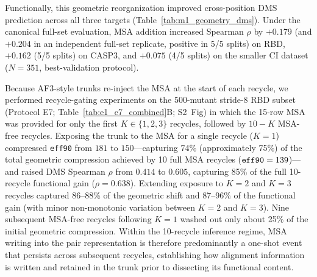 \documentclass[10pt,a4paper]{article}
\begin{document}
Functionally, this geometric reorganization improved cross-position DMS prediction across all three targets (Table~\ref{tab:m1_geometry_dms}). Under the canonical full-set evaluation, MSA addition increased Spearman $\rho$ by $+0.179$ (and $+0.204$ in an independent full-set replicate, positive in 5/5 splits) on RBD, $+0.162$ (5/5 splits) on CASP3, and $+0.075$ (4/5 splits) on the smaller CI dataset ($N=351$, best-validation protocol).

Because AF3-style trunks re-inject the MSA at the start of each recycle, we performed recycle-gating experiments on the 500-mutant stride-8 RBD subset (Protocol E7; Table~\ref{tab:e1_e7_combined}B; S2~Fig) in which the 15-row MSA was provided for only the first $K \in \{1, 2, 3\}$ recycles, followed by $10 - K$ MSA-free recycles. Exposing the trunk to the MSA for a single recycle ($K=1$) compressed \texttt{eff90} from $181$ to $150$---capturing 74\% (approximately 75\%) of the total geometric compression achieved by 10 full MSA recycles ($\text{\texttt{eff90}} = 139$)---and raised DMS Spearman $\rho$ from $0.414$ to $0.605$, capturing 85\% of the full 10-recycle functional gain ($\rho = 0.638$). Extending exposure to $K=2$ and $K=3$ recycles captured 86--88\% of the geometric shift and 87--96\% of the functional gain (with minor non-monotonic variation between $K=2$ and $K=3$). Nine subsequent MSA-free recycles following $K=1$ washed out only about 25\% of the initial geometric compression. Within the 10-recycle inference regime, MSA writing into the pair representation is therefore predominantly a one-shot event that persists across subsequent recycles, establishing how alignment information is written and retained in the trunk prior to dissecting its functional content.
\end{document}
